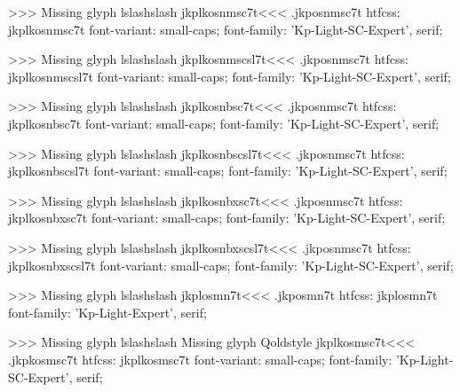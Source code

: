 >>>
Missing glyph	lslashslash
\<jkplkosnmsc7t\><<<
.jkposnmsc7t
htfcss:  jkplkosnmsc7t  font-variant: small-caps; font-family: 'Kp-Light-SC-Expert', serif;

>>>
Missing glyph	lslashslash
\<jkplkosnmscsl7t\><<<
.jkposnmsc7t
htfcss:  jkplkosnmscsl7t  font-variant: small-caps; font-family: 'Kp-Light-SC-Expert', serif;

>>>
Missing glyph	lslashslash
\<jkplkosnbsc7t\><<<
.jkposnmsc7t
htfcss:  jkplkosnbsc7t  font-variant: small-caps; font-family: 'Kp-Light-SC-Expert', serif;

>>>
Missing glyph	lslashslash
\<jkplkosnbscsl7t\><<<
.jkposnmsc7t
htfcss:  jkplkosnbscsl7t  font-variant: small-caps; font-family: 'Kp-Light-SC-Expert', serif;

>>>
Missing glyph	lslashslash
\<jkplkosnbxsc7t\><<<
.jkposnmsc7t
htfcss:  jkplkosnbxsc7t  font-variant: small-caps; font-family: 'Kp-Light-SC-Expert', serif;

>>>
Missing glyph	lslashslash
\<jkplkosnbxscsl7t\><<<
.jkposnmsc7t
htfcss:  jkplkosnbxscsl7t  font-variant: small-caps; font-family: 'Kp-Light-SC-Expert', serif;

>>>
Missing glyph	lslashslash
\<jkplosmn7t\><<<
.jkposmn7t
htfcss:  jkplosmn7t  font-family: 'Kp-Light-Expert', serif;

>>>
Missing glyph	lslashslash
Missing glyph	Qoldstyle
\<jkplkosmsc7t\><<<
.jkpkosmsc7t
htfcss:  jkplkosmsc7t  font-variant: small-caps; font-family: 'Kp-Light-SC-Expert', serif;

